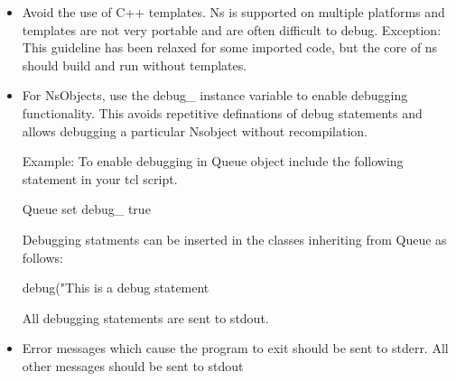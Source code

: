 \begin{itemize}
\item Avoid the use of C++ templates.
Ns is supported on multiple platforms and templates are not
very portable and are often difficult to debug.
Exception: This guideline has been relaxed for some imported code,
but the core of ns should build and run without templates.

\item For NsObjects, use the debug\_ instance variable to enable debugging functionality.
This avoids repetitive definations of debug statements and allows debugging a particular
Nsobject without recompilation.

Example:
To enable debugging in Queue object include the following statement in your tcl script.
\begin{program}
	Queue set debug_ true
\end{program}

Debugging statments can be inserted in the classes inheriting from Queue as follows:

\begin{program}
	debug("This is a debug statement %
\end{program}

All debugging statements are sent to stdout.


\item Error messages which cause the program to exit should be sent to stderr.
All other messages should be sent to stdout
\end{itemize}
